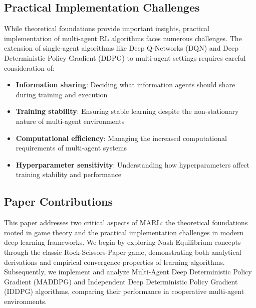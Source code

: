 \documentclass[conference]{IEEEtran}
\begin{document}
\subsection{Practical Implementation Challenges}

While theoretical foundations provide important insights, practical implementation of multi-agent RL algorithms faces numerous challenges. The extension of single-agent algorithms like Deep Q-Networks (DQN) and Deep Deterministic Policy Gradient (DDPG) to multi-agent settings requires careful consideration of:

\begin{itemize}
    \item \textbf{Information sharing}: Deciding what information agents should share during training and execution
    \item \textbf{Training stability}: Ensuring stable learning despite the non-stationary nature of multi-agent environments
    \item \textbf{Computational efficiency}: Managing the increased computational requirements of multi-agent systems
    \item \textbf{Hyperparameter sensitivity}: Understanding how hyperparameters affect training stability and performance
\end{itemize}

\subsection{Paper Contributions}

This paper addresses two critical aspects of MARL: the theoretical foundations rooted in game theory and the practical implementation challenges in modern deep learning frameworks. We begin by exploring Nash Equilibrium concepts through the classic Rock-Scissors-Paper game, demonstrating both analytical derivations and empirical convergence properties of learning algorithms. Subsequently, we implement and analyze Multi-Agent Deep Deterministic Policy Gradient (MADDPG) and Independent Deep Deterministic Policy Gradient (IDDPG) algorithms, comparing their performance in cooperative multi-agent environments.
\end{document}
